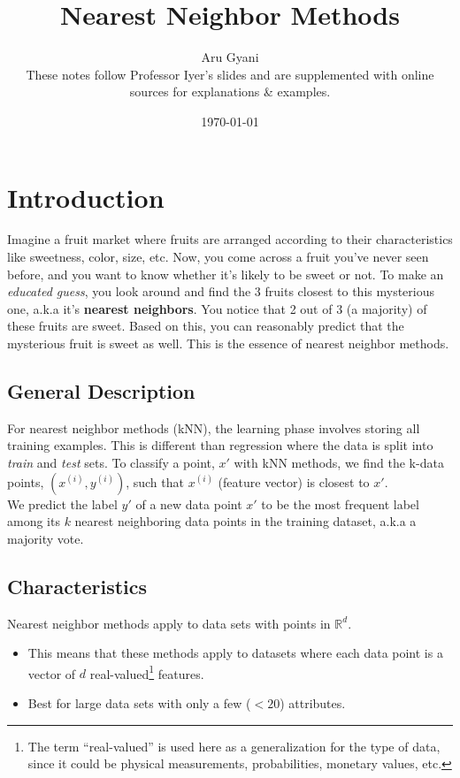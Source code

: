 \documentclass{report}
\title{Nearest Neighbor Methods}
\author{Aru Gyani\\\small{These notes follow Professor Iyer's slides and are
supplemented with online sources for explanations \& examples.}}
\date{\today}
\begin{document}
\addtolength{\skip\footins}{20pt}
\maketitle
\tableofcontents
\clearpage

\chapter{Introduction}

Imagine a fruit market where fruits are arranged according to their
characteristics like sweetness, color, size, etc.
Now, you come across a fruit you've never seen before, and you want to know whether it's likely to be sweet
or not. To make an \emph{educated guess}, you look around and find the 3 fruits
closest to this mysterious one, a.k.a it's \textbf{nearest neighbors}. You
notice that 2 out of 3 (a majority) of these fruits are sweet. Based on this, you can
reasonably predict that the mysterious fruit is sweet as well. This is the essence of nearest neighbor methods. 

\section{General Description}
For nearest neighbor methods (kNN), the learning phase involves storing all training
examples. This is different than regression where the data is split into
\emph{train} and \emph{test} sets. To classify a point, \(x'\) with kNN methods, we find
the k-data points, \((x^{(i)}, y^{(i)})\), such that \(x^{(i)}\) (feature
vector) is closest to \(x'\). 
\\[12pt]
We predict the label \(y'\) of a new data point \(x'\) to be the most frequent
label among its \(k\) nearest neighboring data points in the training dataset,
a.k.a a majority vote.

\section{Characteristics}
Nearest neighbor methods apply to data sets with points in \(\mathds{R}^d\).
  \begin{itemize}
    \item This means that these methods apply to datasets where each
    data point is a vector of \(d\) real-valued\footnote{The term ``real-valued''
    is used here as a generalization for the type of data, since it could be
    physical measurements, probabilities, monetary values, etc.} features.
    \item Best for large data sets with only a few (\(< 20\)) attributes.
  \end{itemize}
\end{document}
